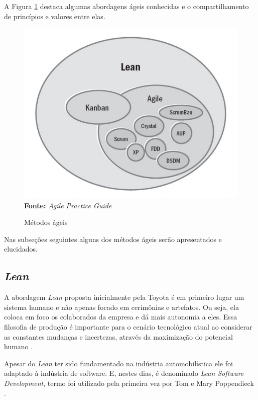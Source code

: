 \documentclass[
    12pt,       %
    openright,      %
    twoside,      %
    a4paper,      %
    english,      %
    french,       %
    spanish,      %
    brazil,       %
    ]{abntex2}
\begin{document}
A Figura \ref{metodosAgeis} destaca algumas abordagens ágeis conhecidas e o compartilhamento de princípios e valores entre elas.

\begin{figure}[h]
    \centering
    \caption{Métodos ágeis}
    \includegraphics[scale=0.5]{src/tex/img/metodosageisPMI.png}\\
    \label{metodosAgeis}
    \textbf{Fonte:} \textit{Agile Practice Guide} \cite{PMIAGILE:2017}
\end{figure}

Nas subseções seguintes alguns dos métodos ágeis serão apresentados e elucidados.

\subsection{ \textit{Lean} }

A abordagem \textit{Lean} proposta inicialmente pela Toyota é em primeiro lugar um sistema humano e não apenas focado em cerimônias e artefatos. Ou seja, ela coloca em foco os colaborados da empresa e dá mais autonomia a eles. Essa filosofia de produção é importante para o cenário tecnológico atual ao considerar as constantes mudanças e incertezas, através da maximização do potencial humano \cite{LEANENT:2016}.

Apesar do \textit{Lean} ter sido fundamentado na indústria automobilística ele foi adaptado à indústria de software. E, nestes dias, é denominado \textit{Lean Software Development}, termo foi utilizado pela primeira vez por Tom e Mary Poppendieck \cite{WAZLAWICK:2013}.
\end{document}
